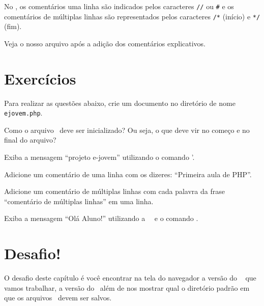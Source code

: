 No \php, os comentários uma linha são indicados pelos caracteres \verb$//$ ou \verb$#$
e os comentários de múltiplas linhas são representados pelos caracteres 
\verb$/*$ (início) e \verb$*/$ (fim).

Veja o nosso arquivo  após a adição dos comentários explicativos.



\section{Exercícios}
\label{cap1-exercicios}

Para realizar as questões abaixo, crie um documento no diretório  
de nome \texttt{ejovem.php}.

\begin{description}[labelindent=19pt]
  \item [Q. 01] Como o arquivo \phpextensao~deve ser inicializado? Ou seja, o que deve vir no
  começo e no final do arquivo?
  \item [Q. 02] Exiba a mensagem ``projeto e-jovem'' utilizando o comando \funcaoecho'.
  \item [Q. 03] Adicione um comentário de uma linha com os dizeres: ``Primeira aula de PHP''.
  \item [Q. 04] Adicione um comentário de múltiplas linhas com cada palavra da frase 
  ``comentário de múltiplas linhas'' em uma linha.
  \item [Q. 05] Exiba a mensagem ``Olá Aluno!'' utilizando a \tag~\taghum~e o comando \funcaoecho.
\end{description}

\section{Desafio!}
\label{desafio}
O desafio deste capítulo é você encontrar na tela do navegador a versão do \php~
que vamos trabalhar, a versão do \apache~além de nos mostrar qual o diretório
padrão em que os arquivos \phpextensao~devem ser salvos.
